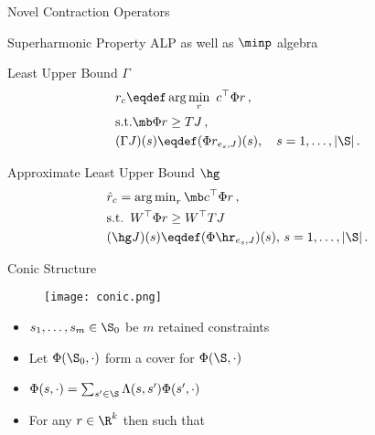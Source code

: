\documentclass[10pt]{beamer}
\begin{document}
\begin{frame}[fragile]{Novel Contraction Operators}
\begin{block}{Superharmonic Property}
ALP as well as $\minp$ algebra
\end{block}
\begin{block}{Least Upper Bound $\Gamma$}
\begin{align*}
\begin{split}
&r_c\eqdef\arg\min_{r} \,\, c^\top \Phi r\,,\\
&\text{s.t.} \mb \Phi r\geq  TJ\,,\\
&(\Gamma J)(s)\eqdef(\Phi r_{e_s,J})(s),\quad s=1,\ldots,|\S|\,.
\end{split}
\end{align*}
\end{block}

\begin{block}{Approximate Least Upper Bound $\hg$}
\begin{align*}
&\hat{r}_c={\arg\min}_r \,\mb c^\top \Phi r\,,\\
&\text{s.t.} \,\,\, W^\top  \Phi r\geq W^\top TJ\,\\
&(\hg J)(s)\eqdef(\Phi \hr_{e_s,J})(s),\, s=1,\ldots,|\S|\,.
\end{align*}
\end{block}
\end{frame}


\begin{frame}[fragile]{Conic Structure}
\begin{figure}
\texttt{[image: conic.png]}
\end{figure}
\begin{block}{}
\begin{itemize}
\item $s_1,\ldots,s_m\in \S_0$ be $m$ retained constraints
\item Let $\Phi(\S_0,\cdot)$ form a {\color{orange}{conic}} cover for $\Phi(\S,\cdot)$
\item $\Phi(s,\cdot)=\sum_{s'\in \S}\Lambda(s,s')\Phi(s',\cdot)$
\item For any $r\in \R^k$ {\color{orange}{$\Phi(s,\cdot) r<0$}} then {\color{orange}{$\exists s'\in \S_0$}} such that {\color{orange}{$\Phi(s',\cdot) r<0$}}
\end{itemize}
\end{block}

\end{frame}
\end{document}
